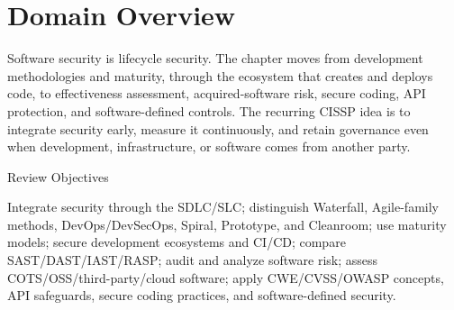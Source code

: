 \documentclass[10pt,letterpaper]{article}
\title{\CornellDocumentTitle}
\author{Arthur Deane and Aaron Kraus}
\date{\today}
\begin{document}
\maketitle

\section*{Domain Overview}
Software security is lifecycle security. The chapter moves from development methodologies and maturity, through the ecosystem that creates and deploys code, to effectiveness assessment, acquired-software risk, secure coding, API protection, and software-defined controls. The recurring CISSP idea is to integrate security early, measure it continuously, and retain governance even when development, infrastructure, or software comes from another party.

\begin{summarybox}{Review Objectives}\raggedright
Integrate security through the SDLC/SLC; distinguish Waterfall, Agile-family methods, DevOps/DevSecOps, Spiral, Prototype, and Cleanroom; use maturity models; secure development ecosystems and CI/CD; compare SAST/DAST/IAST/RASP; audit and analyze software risk; assess COTS/OSS/third-party/cloud software; apply CWE/CVSS/OWASP concepts, API safeguards, secure coding practices, and software-defined security.
\end{summarybox}
\end{document}
